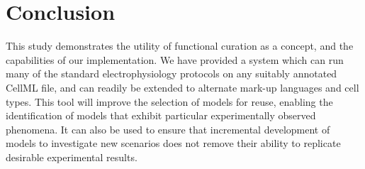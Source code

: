 \documentclass[preprint,authoryear,12pt]{elsarticle}
\begin{document}


\section{Conclusion}
\label{sec:conclusion}

This study demonstrates the utility of functional curation as a concept, and the capabilities of our implementation.
We have provided a system which can run many of the standard electrophysiology protocols on any suitably annotated CellML file, and can readily be extended to alternate mark-up languages and cell types.
This tool will improve the selection of models for reuse, enabling the identification of models that exhibit particular experimentally observed phenomena.
It can also be used to ensure that incremental development of models to investigate new scenarios does not remove their ability to replicate desirable experimental results.


\end{document}
